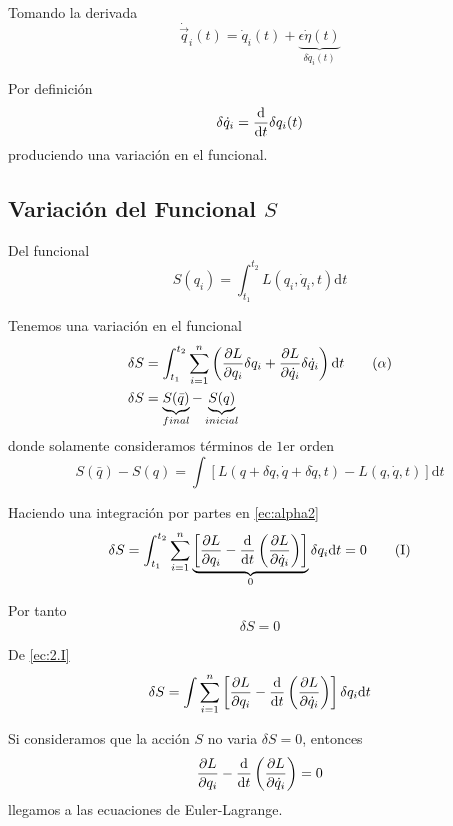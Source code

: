 \documentclass[../main]{subfiles}
\begin{document}
Tomando la derivada
\begin{equation}
    \dot{\vec{q}}_i(t)=\dot{q}_i(t)+\underbrace{\epsilon \dot{\eta}(t)}_{\delta \dot{q}_i(t)}
\end{equation}

Por definición
\begin{equation}
    \delta \dot{q}_i=\dv{}{t}\delta q_i(t)
\end{equation}
produciendo una variación en el funcional.
\subsection{Variación del Funcional $S$}
Del funcional
\begin{equation}
    S(q_i)=\int_{t_1}^{t_2} L(q_i,\dot{q}_i, t)\mathrm{d}t
\end{equation}

Tenemos una variación en el funcional
\begin{align}
    \delta S&=\int_{t_1}^{t_2} \sum_{i=1}^n \left(\pdv{L}{q_i}\delta q_i+\pdv{L}{\dot{q}_i}\delta \dot{q}_i\right)\mathrm{d}t \tag{$\alpha$} \label{ec:alpha2}\\
    \delta S&=\underbrace{S(\bar{q})}_{final}-\underbrace{S(q)}_{inicial}
\end{align}
donde solamente consideramos términos de $1$er orden
\begin{equation}
    S(\bar{q})-S(q)=\int \left[L(q+\delta q, \dot{q}+\delta \dot{q}, t)-L(q, \dot{q}, t)\right]\mathrm{d}t
\end{equation}

Haciendo una integración por partes en \eqref{ec:alpha2}
\begin{equation}
    \delta S= \int_{t_1}^{t_2} \sum_{i=1}^n\underbrace{\left[\pdv{L}{q_i}-\dv{}{t}\left(\pdv{L}{\dot{q}_i}\right)\right]}_{0} \delta q_i \mathrm{d}t=0 \tag{I} \label{ec:2.I}
\end{equation}

Por tanto 
\begin{equation}
    \delta S=0
\end{equation}

De \eqref{ec:2.I}
\begin{equation}
    \delta S = \int \sum_{i=1}^n \left[\pdv{L}{q_i}-\dv{}{t}\left(\pdv{L}{\dot{q}_i}\right)\right]\delta q_i \mathrm{d}t
\end{equation}

Si consideramos que la acción $S$ no varia $\delta S=0$, entonces
\begin{equation}
    \pdv{L}{q_i}-\dv{}{t}\left(\pdv{L}{\dot{q}_i}\right)=0
\end{equation}
llegamos a las ecuaciones de Euler-Lagrange.
\end{document}
